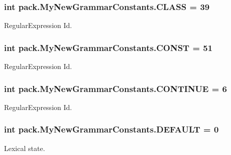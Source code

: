 \subsubsection[{\texorpdfstring{C\+L\+A\+SS}{CLASS}}]{\setlength{\rightskip}{0pt plus 5cm}int pack.\+My\+New\+Grammar\+Constants.\+C\+L\+A\+SS = 39}\hypertarget{interfacepack_1_1_my_new_grammar_constants_a24d4f53605edeff5f76bdfaee1b62748}{}\label{interfacepack_1_1_my_new_grammar_constants_a24d4f53605edeff5f76bdfaee1b62748}
Regular\+Expression Id. 
\subsubsection[{\texorpdfstring{C\+O\+N\+ST}{CONST}}]{\setlength{\rightskip}{0pt plus 5cm}int pack.\+My\+New\+Grammar\+Constants.\+C\+O\+N\+ST = 51}\hypertarget{interfacepack_1_1_my_new_grammar_constants_a2e6571eab93f2021729d4a4ea6003b50}{}\label{interfacepack_1_1_my_new_grammar_constants_a2e6571eab93f2021729d4a4ea6003b50}
Regular\+Expression Id. 
\subsubsection[{\texorpdfstring{C\+O\+N\+T\+I\+N\+UE}{CONTINUE}}]{\setlength{\rightskip}{0pt plus 5cm}int pack.\+My\+New\+Grammar\+Constants.\+C\+O\+N\+T\+I\+N\+UE = 6}\hypertarget{interfacepack_1_1_my_new_grammar_constants_aacc1e0ad9532847f7df7b503613ef276}{}\label{interfacepack_1_1_my_new_grammar_constants_aacc1e0ad9532847f7df7b503613ef276}
Regular\+Expression Id. 
\subsubsection[{\texorpdfstring{D\+E\+F\+A\+U\+LT}{DEFAULT}}]{\setlength{\rightskip}{0pt plus 5cm}int pack.\+My\+New\+Grammar\+Constants.\+D\+E\+F\+A\+U\+LT = 0}\hypertarget{interfacepack_1_1_my_new_grammar_constants_a327e5cf188b0d3278a1673279c3beb40}{}\label{interfacepack_1_1_my_new_grammar_constants_a327e5cf188b0d3278a1673279c3beb40}
Lexical state. 
